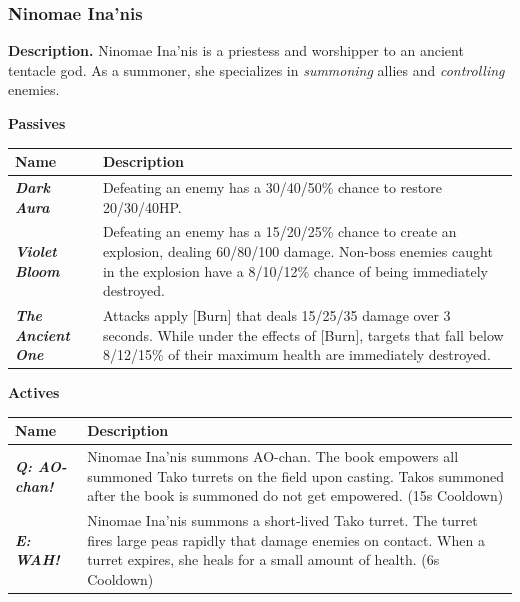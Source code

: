 \documentclass[10pt, a4paper]{article}
\begin{document}
\begin{multicols}{2}
	\subsubsection{Ninomae Ina'nis}
  	
  	\textbf{Description.} Ninomae Ina'nis is a priestess and worshipper to an ancient tentacle god. As a summoner, she specializes in \textit{summoning} allies and \textit{controlling} enemies.

	\textbf{Passives}
	
	\begin{center}
		\begin{tabular}{|p{2.7cm}|p{5.5cm}|}
			\hline
			\textbf{Name} & \textbf{Description} \\
			\hline
			\textit{\textbf{Dark Aura}} & Defeating an enemy has a 30/40/50\% chance to restore 20/30/40HP. \\
			\textit{\textbf{Violet Bloom}} & Defeating an enemy has a 15/20/25\% chance to create an explosion, dealing 60/80/100 damage. Non-boss enemies caught in the explosion have a 8/10/12\% chance of being immediately destroyed. \\
			\textit{\textbf{The Ancient One}}  & Attacks apply [Burn] that deals 15/25/35 damage over 3 seconds. While under the effects of [Burn], targets that fall below 8/12/15\% of their maximum health are immediately destroyed. \\
			\hline	
		\end{tabular}
	\end{center}
	
	\begin{center}
		\textbf{Actives}
	\end{center}
	
	\begin{center}
		\begin{tabular}{|p{2.7cm}|p{5.5cm}|}
			\hline
			\textbf{Name} & \textbf{Description} \\
			\hline
			\textit{\textbf{Q: AO-chan!}} & Ninomae Ina'nis summons AO-chan. The book empowers all summoned Tako turrets on the field upon casting. Takos summoned after the book is summoned do not get empowered. (15s Cooldown)\\
			\textit{\textbf{E: WAH!}} & Ninomae Ina'nis summons a short-lived Tako turret. The turret fires large peas rapidly that damage enemies on contact. When a turret expires, she heals for a small amount of health. (6s Cooldown) \\
			\hline
		\end{tabular}
	\end{center}
  	

\end{multicols}
\end{document}
